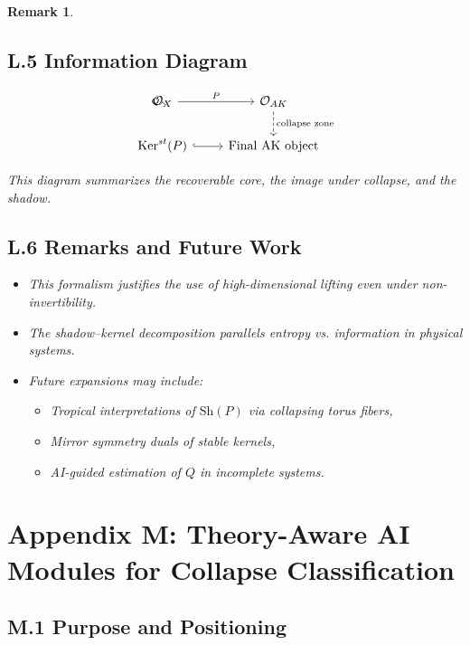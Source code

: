 \documentclass[11pt]{article}
\newtheorem{remark}[theorem]{Remark}
\begin{document}
\begin{remark}
\subsection*{L.5 Information Diagram}

\[
\begin{tikzcd}
\mathcal{O}_X \arrow[r, "P"] \arrow[dashed, bend right, swap, "Q"'] &
\mathcal{O}_{AK} \arrow[d, dashed, "\text{collapse zone}"] \\
\mathrm{Ker}^{st}(P) \arrow[r, hook] &
\text{Final AK object}
\end{tikzcd}
\]

This diagram summarizes the recoverable core, the image under collapse, and the shadow.

\subsection*{L.6 Remarks and Future Work}

\begin{itemize}
  \item This formalism justifies the use of high-dimensional lifting even under non-invertibility.
  \item The shadow–kernel decomposition parallels entropy vs. information in physical systems.
  \item Future expansions may include:
    \begin{itemize}
      \item Tropical interpretations of $\mathrm{Sh}(P)$ via collapsing torus fibers,
      \item Mirror symmetry duals of stable kernels,
      \item AI-guided estimation of $Q$ in incomplete systems.
    \end{itemize}
\end{itemize}



\section*{Appendix M: Theory-Aware AI Modules for Collapse Classification}

\subsection*{M.1 Purpose and Positioning}


\end{remark}
\end{document}
